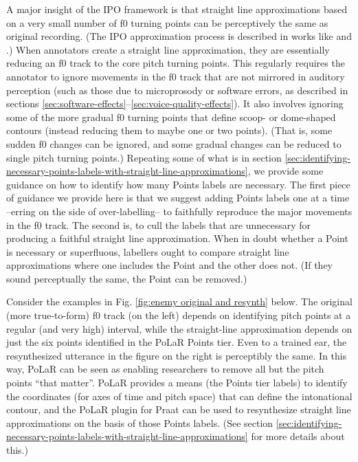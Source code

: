 \documentclass[11pt, twoside]{memoir}
\begin{document}
A major insight of the IPO framework is that straight line approximations based on a very small number of f0 turning points can be perceptively the same as original recording. (The IPO approximation process is described in works like \citealt{dutoit97} and \citealt{rao12}.) When annotators create a straight line approximation, they are essentially reducing an f0 track to the core pitch turning points. This regularly requires the annotator to ignore movements in the f0 track that are not mirrored in auditory perception (such as those due to microprosody or software errors, as described in sections \ref{sec:software-effects}–\ref{sec:voice-quality-effects}). It also involves ignoring some of the more gradual f0 turning points that define scoop- or dome-shaped contours (instead reducing them to maybe one or two points). (That is, some sudden f0 changes can be ignored, and some gradual changes can be reduced to single pitch turning points.) Repeating some of what is in section \ref{sec:identifying-necessary-points-labels-with-straight-line-approximations}, we provide some guidance on how to identify how many Points labels are necessary. The first piece of guidance we provide here is that we suggest adding Points labels one at a time –erring on the side of over-labelling– to faithfully reproduce the major movements in the f0 track. The second is, to cull the labels that are unnecessary for producing a faithful straight line approximation. When in doubt whether a Point is necessary or superfluous, labellers ought to compare straight line approximations where one includes the Point and the other does not. (If they sound perceptually the same, the Point can be removed.) 

Consider the examples in Fig. \ref{fig:enemy original and resynth} below. The original (more true-to-form) f0 track (on the left) depends on identifying pitch points at a regular (and very high) interval, while the straight-line approximation depends on just the six points identified in the PoLaR Points tier. Even to a trained ear, the resynthesized utterance in the figure on the right is perceptibly the same. In this way, PoLaR can be seen as enabling researchers to remove all but the pitch points “that matter”. PoLaR provides a means (the Points tier labels) to identify the coordinates (for axes of time and pitch space) that can define the intonational contour, and the PoLaR plugin for Praat can be used to resynthesize straight line approximations on the basis of those Points labels. (See section \ref{sec:identifying-necessary-points-labels-with-straight-line-approximations} for more details about this.)
\end{document}
